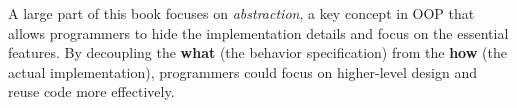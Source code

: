 \documentclass[oneside,11pt,dvipsnames]{book}
\begin{document}















A large part of this book focuses on \emph{abstraction}, a key concept in OOP that allows programmers to hide the implementation details and focus on the essential features. By decoupling the \textbf{what} (the  behavior specification) from the \textbf{how} (the actual implementation), programmers could focus on higher-level design and reuse code more effectively.
\end{document}
